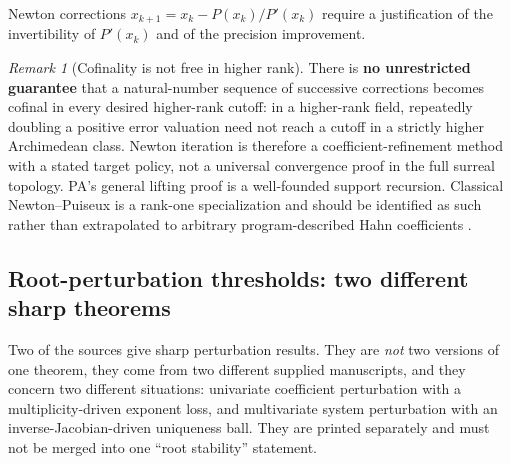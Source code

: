 \documentclass[11pt,letterpaper]{article}
\numberwithin{equation}{section}
\theoremstyle{definition}
\theoremstyle{remark}
\newtheorem{remark}[theorem]{Remark}
\begin{document}
Newton corrections $x_{k+1}=x_k-P(x_k)/P'(x_k)$ require a justification of the
invertibility of $P'(x_k)$ and of the precision improvement.

\begin{remark}[Cofinality is not free in higher rank]\label{cas:rem-cofinal}
There is \textbf{no unrestricted guarantee} that a natural-number sequence of
successive corrections becomes cofinal in every desired higher-rank cutoff: in a
higher-rank field, repeatedly doubling a positive error valuation need not reach
a cutoff in a strictly higher Archimedean class. Newton iteration is therefore a
coefficient-refinement method with a stated target policy, not a universal
convergence proof in the full surreal topology. PA's general lifting proof is a
well-founded support recursion. Classical Newton--Puiseux is a rank-one
specialization and should be identified as such rather than extrapolated to
arbitrary program-described Hahn coefficients
\cite{cas:Poonen,cas:SourcePolynomial}.
\end{remark}

\subsection{Root-perturbation thresholds: two different sharp theorems}
\label{cas:sub-rootperturbation}
Two of the sources give sharp perturbation results. They are \emph{not} two
versions of one theorem, they come from two different supplied manuscripts, and
they concern two different situations: univariate coefficient perturbation with
a multiplicity-driven exponent loss, and multivariate system perturbation with
an inverse-Jacobian-driven uniqueness ball. They are printed separately and must
not be merged into one ``root stability'' statement.
\end{document}
